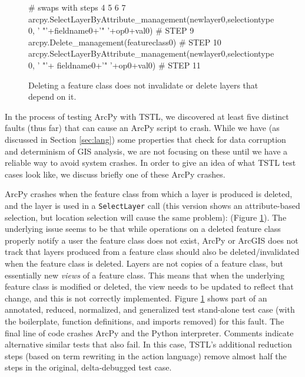 \begin{figure}
{\begin{code}
\textcolor{black!60}{\#  swaps with steps 4 5 6 7}
arcpy.SelectLayerByAttribute\_management(newlayer0,selectiontype0,
   ' "'+fieldname0+'" '+op0+val0)                                         \textcolor{black!60}{\# STEP 9}
arcpy.Delete\_management(featureclass0)                                    \textcolor{black!60}{\# STEP 10}
arcpy.SelectLayerByAttribute\_management(newlayer0,selectiontype0,
   ' "'+ fieldname0+'" '+op0+val0)                                        \textcolor{black!60}{\# STEP 11}
\end{code}
}
\caption{Deleting a feature class does not invalidate or delete layers that depend on it.}
\label{fault1}
\end{figure}

In the process of testing ArcPy with TSTL, we discovered at least five
distinct faults
(thus far) that can cause an ArcPy script to crash.  While we have (as
discussed in Section \ref{sec:lang}) some properties that check for
data corruption and determinism of GIS analysis, we are not focusing
on these until we have a reliable way to avoid system crashes.   In
order to give an idea of what TSTL test cases look like, we discuss
briefly one of these ArcPy crashes.

ArcPy crashes when the feature class from which a layer is produced is
deleted, and the layer is used in a {\tt SelectLayer} call (this
version shows an attribute-based selection, but location selection
will cause the same problem): (Figure \ref{fault1}).  The underlying issue seems to be that
while operations on a deleted feature class properly notify a user the
feature class does not exist, ArcPy or ArcGIS does not track that
layers produced from a feature class should also be deleted/invalidated
when the feature class is deleted.  Layers are not copies
of a feature class, but essentially new \emph{views} of a feature class.
This means that when the underlying feature class is modified or
deleted, the view needs to be updated to reflect that change, and this
is not correctly implemented.  Figure \ref{fault1} shows part of an
annotated, reduced, normalized, and generalized test stand-alone test
case (with the boilerplate, function definitions, and imports
removed) for this fault.  The final line of code crashes ArcPy and the
Python interpreter.  Comments indicate alternative similar tests that
also fail.  In this case, TSTL's additional reduction steps (based on
term rewriting in the action language) remove almost half the steps in
the original, delta-debugged test case.

